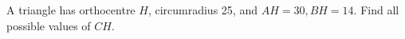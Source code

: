A triangle has orthocentre $H$, circumradius 25, and $AH=30,BH=14$. Find all possible values of $CH$.
